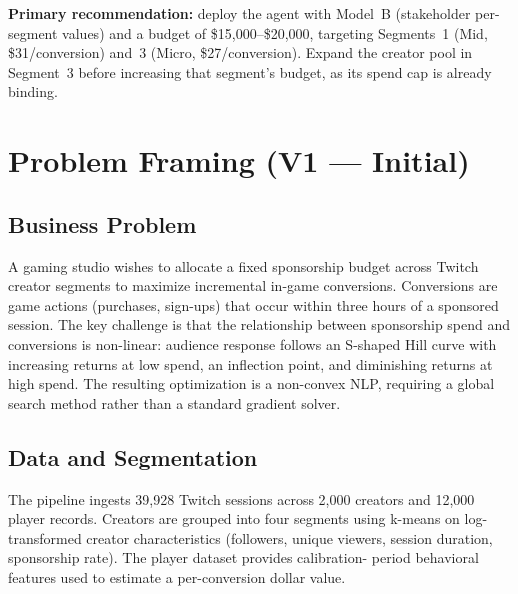 \documentclass[11pt,letterpaper]{article}
\begin{document}
\textbf{Primary recommendation:} deploy the agent with Model~B (stakeholder
per-segment values) and a budget of \$15{,}000--\$20{,}000, targeting
Segments~1 (Mid, \$31/conversion) and~3 (Micro, \$27/conversion). Expand
the creator pool in Segment~3 before increasing that segment's budget, as
its spend cap is already binding.

\newpage

\section{Problem Framing (V1 --- Initial)}

\subsection{Business Problem}

A gaming studio wishes to allocate a fixed sponsorship budget across Twitch
creator segments to maximize incremental in-game conversions. Conversions are
game actions (purchases, sign-ups) that occur within three hours of a sponsored
session. The key challenge is that the relationship between sponsorship
spend and conversions is non-linear: audience response follows an S-shaped
Hill curve with increasing returns at low spend, an inflection point, and
diminishing returns at high spend. The resulting optimization is a non-convex
NLP, requiring a global search method rather than a standard gradient solver.

\subsection{Data and Segmentation}

The pipeline ingests 39{,}928 Twitch sessions across 2{,}000 creators and
12{,}000 player records. Creators are grouped into four segments using
k-means on log-transformed creator characteristics (followers, unique viewers,
session duration, sponsorship rate). The player dataset provides calibration-
period behavioral features used to estimate a per-conversion dollar value.
\end{document}
